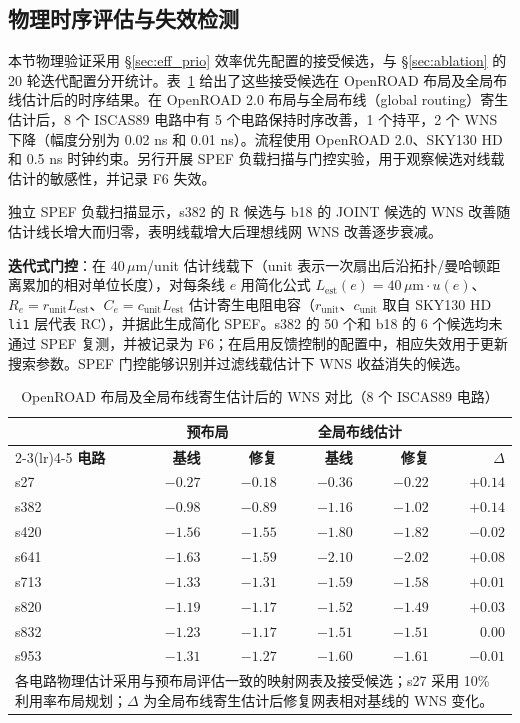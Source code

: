 \documentclass[twocolumn,10pt,fontset=windows]{ctexart}
\begin{document}
\subsection{物理时序评估与失效检测}\label{sec:phys_closure}

本节物理验证采用 \S\ref{sec:eff_prio} 效率优先配置的接受候选，与 \S\ref{sec:ablation} 的 20 轮迭代配置分开统计。表~\ref{tab:pr8} 给出了这些接受候选在 OpenROAD 布局及全局布线估计后的时序结果。在 OpenROAD 2.0 布局与全局布线（global routing）寄生估计后，8 个 ISCAS89 电路中有 5 个电路保持时序改善，1 个持平，2 个 WNS 下降（幅度分别为 0.02 ns 和 0.01 ns）。流程使用 OpenROAD 2.0、SKY130 HD 和 0.5 ns 时钟约束。另行开展 SPEF 负载扫描与门控实验，用于观察候选对线载估计的敏感性，并记录 F6 失效。


独立 SPEF 负载扫描显示，s382 的 R 候选与 b18 的 JOINT 候选的 WNS 改善随估计线长增大而归零，表明线载增大后理想线网 WNS 改善逐步衰减。

\textbf{迭代式门控}：在 40\,$\mu$m/unit 估计线载下（unit 表示一次扇出后沿拓扑/曼哈顿距离累加的相对单位长度），对每条线 $e$ 用简化公式 $L_{\mathrm{est}}(e)=40\,\mu\mathrm{m} \cdot u(e)$、$R_e=r_{\mathrm{unit}}L_{\mathrm{est}}$、$C_e=c_{\mathrm{unit}}L_{\mathrm{est}}$ 估计寄生电阻电容（$r_{\mathrm{unit}}$、$c_{\mathrm{unit}}$ 取自 SKY130 HD \texttt{li1} 层代表 RC），并据此生成简化 SPEF。s382 的 50 个和 b18 的 6 个候选均未通过 SPEF 复测，并被记录为 F6；在启用反馈控制的配置中，相应失效用于更新搜索参数。SPEF 门控能够识别并过滤线载估计下 WNS 收益消失的候选。


\begin{table}[ht]
\centering
\caption{OpenROAD 布局及全局布线寄生估计后的 WNS 对比（8 个 ISCAS89 电路）}
\label{tab:pr8}
\footnotesize
\setlength{\tabcolsep}{2pt}
\begin{tabular}{lrrrrr}
\toprule
 & \multicolumn{2}{c}{\textbf{预布局}} & \multicolumn{2}{c}{\textbf{全局布线估计}} & \\
\cmidrule(lr){2-3}\cmidrule(lr){4-5}
\textbf{电路} & \textbf{基线} & \textbf{修复} & \textbf{基线} & \textbf{修复} & $\Delta$ \\
\midrule
s27  & $-0.27$ & $-0.18$ & $-0.36$ & $-0.22$ & $+0.14$ \\
s382 & $-0.98$ & $-0.89$ & $-1.16$ & $-1.02$ & $+0.14$ \\
s420 & $-1.56$ & $-1.55$ & $-1.80$ & $-1.82$ & $-0.02$ \\
s641 & $-1.63$ & $-1.59$ & $-2.10$ & $-2.02$ & $+0.08$ \\
s713 & $-1.33$ & $-1.31$ & $-1.59$ & $-1.58$ & $+0.01$ \\
s820 & $-1.19$ & $-1.17$ & $-1.52$ & $-1.49$ & $+0.03$ \\
s832 & $-1.23$ & $-1.17$ & $-1.51$ & $-1.51$ & $0.00$ \\
s953 & $-1.31$ & $-1.27$ & $-1.60$ & $-1.61$ & $-0.01$ \\
\bottomrule
\multicolumn{6}{p{0.92\columnwidth}}{\footnotesize 各电路物理估计采用与预布局评估一致的映射网表及接受候选；s27 采用 10\% 利用率布局规划；$\Delta$ 为全局布线寄生估计后修复网表相对基线的 WNS 变化。}\\
\end{tabular}
\end{table}
\end{document}
